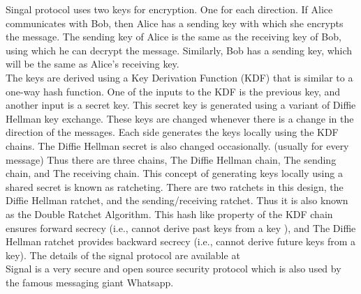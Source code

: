\documentclass[12pt, conference, a4paper]{article}
\begin{document}
Singal protocol uses two keys for encryption. One for each direction. If Alice communicates with Bob, then Alice has a sending key with which she encrypts the message. The sending key of Alice is the same as the receiving key of Bob, using which he can decrypt
the message. Similarly, Bob has a sending key, which will be the same as Alice's receiving key. \\ 
The keys are derived using a Key Derivation Function (KDF) that is similar to a one-way hash function. One of the inputs to the KDF is the previous key, and another input is a secret key. This secret key is generated using a variant of Diffie Hellman key exchange. 
These keys are changed whenever there is a change in the direction of the messages. Each side generates the keys locally using the KDF chains. The Diffie Hellman secret is also changed occasionally. (usually for every message) Thus there are three chains, The Diffie Hellman chain, The sending chain, and The receiving chain. This concept of generating keys locally using a shared secret is known as ratcheting. There are two ratchets in this design, the Diffie Hellman ratchet, and the sending/receiving ratchet. Thus it is also known as the Double Ratchet Algorithm. This hash like property of the KDF chain ensures forward secrecy (i.e., cannot derive past keys from a key ), and The Diffie Hellman ratchet provides backward secrecy (i.e., cannot derive future keys from a key).
The details of the signal protocol are available at \cite{signalDoc} \\
Signal is a very secure and open source security protocol which is also used by the famous messaging giant Whatsapp.      
\end{document}
